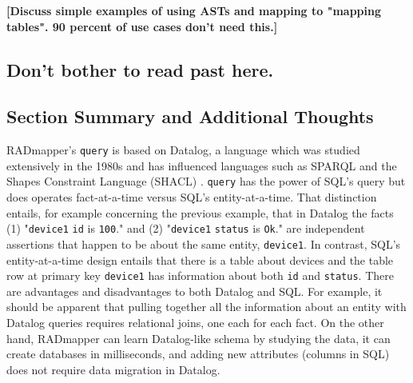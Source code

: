 \documentclass[10pt,letterpaper]{article} %
\newcommand{\stt}[1]{\texttt{#1}} %
\begin{document}

\textbf{[Discuss simple examples of using ASTs and mapping to "mapping tables". 90 percent of use cases don't need this.]}

\subsection{Don't bother to read past here.}

\subsection{Section Summary and Additional Thoughts}

RADmapper's \stt{query} is based on Datalog, a language which was studied extensively in the 1980s \cite{Abiteboul1995a}
and has influenced languages such as SPARQL and the Shapes Constraint Language (SHACL) \cite{?}.
\stt{query} has the power of SQL's  query but does operates fact-at-a-time versus SQL's entity-at-a-time.
That distinction entails, for example concerning the previous example, that in Datalog the facts (1) "\stt{device1} \stt{id} is \stt{100}." and (2) "\stt{device1} \stt{status} is \stt{Ok}." are independent assertions that happen to be about the same entity, \stt{device1}.
In contrast, SQL's entity-at-a-time design entails that there is a table about devices and the table row at primary key \stt{device1} has information about both \stt{id} and \stt{status}.
There are advantages and disadvantages to both Datalog and SQL.\@
For example, it should be apparent that pulling together all the information about an entity with Datalog queries requires relational joins, one each for each fact.
On the other hand, RADmapper can learn Datalog-like schema by studying the data, it can create databases in milliseconds, and adding new attributes (columns in SQL) does not require data migration in Datalog.
\end{document}
